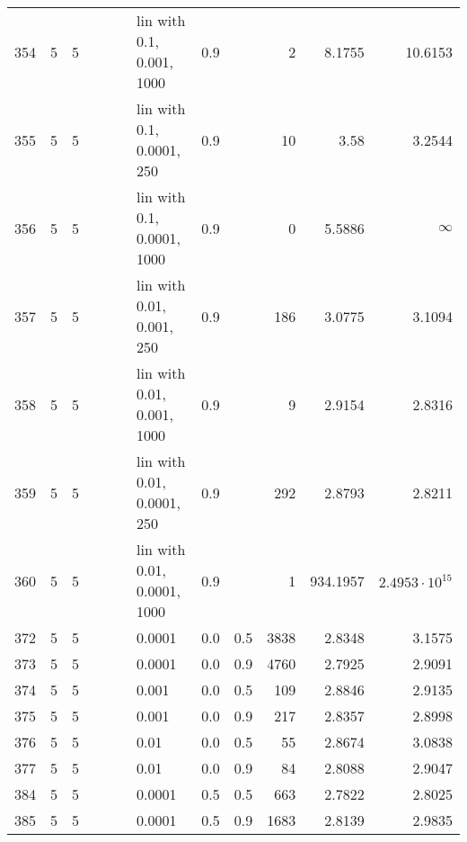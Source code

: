 \begin{longtable}{lrrrrrlrrrrr}
  354 &       5 & 5 &   &   &   &   lin with 0.1, 0.001, 1000 &      0.9 &        &       2 &                 8.1755 &                10.6153 \\
  355 &       5 & 5 &   &   &   &   lin with 0.1, 0.0001, 250 &      0.9 &        &      10 &                   3.58 &                 3.2544 \\
  356 &       5 & 5 &   &   &   &  lin with 0.1, 0.0001, 1000 &      0.9 &        &       0 &                 5.5886 &               $\infty$ \\
  357 &       5 & 5 &   &   &   &   lin with 0.01, 0.001, 250 &      0.9 &        &     186 &                 3.0775 &                 3.1094 \\
  358 &       5 & 5 &   &   &   &  lin with 0.01, 0.001, 1000 &      0.9 &        &       9 &                 2.9154 &                 2.8316 \\
  359 &       5 & 5 &   &   &   &  lin with 0.01, 0.0001, 250 &      0.9 &        &     292 &                 2.8793 &                 2.8211 \\
  360 &       5 & 5 &   &   &   & lin with 0.01, 0.0001, 1000 &      0.9 &        &       1 &               934.1957 &  $2.4953\cdot 10^{15}$ \\
  372 &       5 & 5 &   &   &   &                      0.0001 &      0.0 &    0.5 &    3838 &                 2.8348 &                 3.1575 \\
  373 &       5 & 5 &   &   &   &                      0.0001 &      0.0 &    0.9 &    4760 &                 2.7925 &                 2.9091 \\
  374 &       5 & 5 &   &   &   &                       0.001 &      0.0 &    0.5 &     109 &                 2.8846 &                 2.9135 \\
  375 &       5 & 5 &   &   &   &                       0.001 &      0.0 &    0.9 &     217 &                 2.8357 &                 2.8998 \\
  376 &       5 & 5 &   &   &   &                        0.01 &      0.0 &    0.5 &      55 &                 2.8674 &                 3.0838 \\
  377 &       5 & 5 &   &   &   &                        0.01 &      0.0 &    0.9 &      84 &                 2.8088 &                 2.9047 \\
  384 &       5 & 5 &   &   &   &                      0.0001 &      0.5 &    0.5 &     663 &                 2.7822 &                 2.8025 \\
  385 &       5 & 5 &   &   &   &                      0.0001 &      0.5 &    0.9 &    1683 &                 2.8139 &                 2.9835 \\

\end{longtable}
